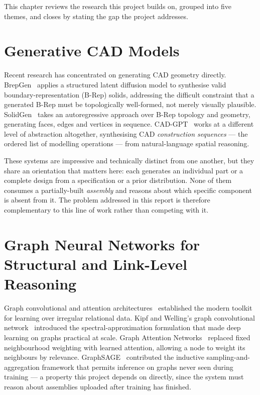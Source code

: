 \documentclass[12pt,oneside,a4paper]{report}
\begin{document}
This chapter reviews the research this project builds on, grouped into five
themes, and closes by stating the gap the project addresses.

\section{Generative CAD Models}

Recent research has concentrated on generating CAD geometry directly.
BrepGen~\cite{brepgen2024} applies a structured latent diffusion model to
synthesise valid boundary-representation (B-Rep) solids, addressing the
difficult constraint that a generated B-Rep must be topologically
well-formed, not merely visually plausible.
SolidGen~\cite{solidgen2024} takes an autoregressive approach over B-Rep
topology and geometry, generating faces, edges and vertices in sequence.
CAD-GPT~\cite{cadgpt2025} works at a different level of abstraction
altogether, synthesising CAD \emph{construction sequences} --- the ordered
list of modelling operations --- from natural-language spatial reasoning.

These systems are impressive and technically distinct from one another, but
they share an orientation that matters here: each generates an individual
part or a complete design from a specification or a prior distribution. None
of them consumes a partially-built \emph{assembly} and reasons about which
specific component is absent from it. The problem addressed in this report is
therefore complementary to this line of work rather than competing with it.

\section{Graph Neural Networks for Structural and Link-Level Reasoning}

Graph convolutional and attention
architectures~\cite{kipf2017gcn,velickovic2018gat,hamilton2017sage}
established the modern toolkit for learning over irregular relational data.
Kipf and Welling's graph convolutional network~\cite{kipf2017gcn} introduced
the spectral-approximation formulation that made deep learning on graphs
practical at scale. Graph Attention Networks~\cite{velickovic2018gat} replaced
fixed neighbourhood weighting with learned attention, allowing a node to
weight its neighbours by relevance. GraphSAGE~\cite{hamilton2017sage}
contributed the inductive sampling-and-aggregation framework that permits
inference on graphs never seen during training --- a property this project
depends on directly, since the system must reason about assemblies uploaded
after training has finished.
\end{document}
